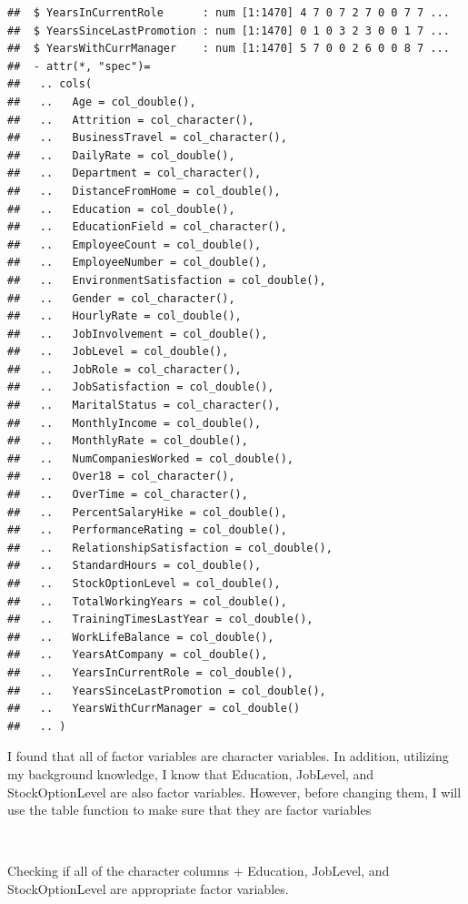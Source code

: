 \documentclass[
]{article}
\begin{document}
\begin{verbatim}
##  $ YearsInCurrentRole      : num [1:1470] 4 7 0 7 2 7 0 0 7 7 ...
##  $ YearsSinceLastPromotion : num [1:1470] 0 1 0 3 2 3 0 0 1 7 ...
##  $ YearsWithCurrManager    : num [1:1470] 5 7 0 0 2 6 0 0 8 7 ...
##  - attr(*, "spec")=
##   .. cols(
##   ..   Age = col_double(),
##   ..   Attrition = col_character(),
##   ..   BusinessTravel = col_character(),
##   ..   DailyRate = col_double(),
##   ..   Department = col_character(),
##   ..   DistanceFromHome = col_double(),
##   ..   Education = col_double(),
##   ..   EducationField = col_character(),
##   ..   EmployeeCount = col_double(),
##   ..   EmployeeNumber = col_double(),
##   ..   EnvironmentSatisfaction = col_double(),
##   ..   Gender = col_character(),
##   ..   HourlyRate = col_double(),
##   ..   JobInvolvement = col_double(),
##   ..   JobLevel = col_double(),
##   ..   JobRole = col_character(),
##   ..   JobSatisfaction = col_double(),
##   ..   MaritalStatus = col_character(),
##   ..   MonthlyIncome = col_double(),
##   ..   MonthlyRate = col_double(),
##   ..   NumCompaniesWorked = col_double(),
##   ..   Over18 = col_character(),
##   ..   OverTime = col_character(),
##   ..   PercentSalaryHike = col_double(),
##   ..   PerformanceRating = col_double(),
##   ..   RelationshipSatisfaction = col_double(),
##   ..   StandardHours = col_double(),
##   ..   StockOptionLevel = col_double(),
##   ..   TotalWorkingYears = col_double(),
##   ..   TrainingTimesLastYear = col_double(),
##   ..   WorkLifeBalance = col_double(),
##   ..   YearsAtCompany = col_double(),
##   ..   YearsInCurrentRole = col_double(),
##   ..   YearsSinceLastPromotion = col_double(),
##   ..   YearsWithCurrManager = col_double()
##   .. )
\end{verbatim}

I found that all of factor variables are character variables. In
addition, utilizing my background knowledge, I know that Education,
JobLevel, and StockOptionLevel are also factor variables. However,
before changing them, I will use the table function to make sure that
they are factor variables

~ ~

Checking if all of the character columns + Education, JobLevel, and
StockOptionLevel are appropriate factor variables.
\end{document}
